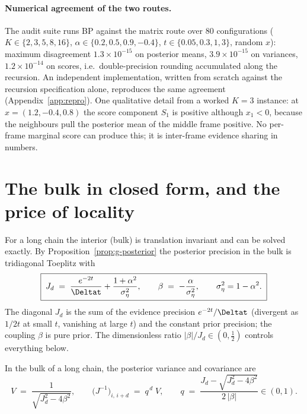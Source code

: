 \paragraph{Numerical agreement of the two routes.} The audit suite runs BP
against the matrix route over $80$ configurations
($K \in \{2,3,5,8,16\}$, $\alpha \in \{0.2, 0.5, 0.9, -0.4\}$,
$t \in \{0.05, 0.3, 1, 3\}$, random $x$): maximum disagreement
$1.3 \times 10^{-15}$ on posterior means, $3.9 \times 10^{-15}$ on
variances, $1.2 \times 10^{-14}$ on scores, i.e.\ double-precision
rounding accumulated along the recursion. An independent implementation,
written from scratch against the recursion specification alone,
reproduces the same agreement (Appendix~\ref{app:repro}). One qualitative
detail from a worked $K = 3$ instance: at $x = (1.2, -0.4, 0.8)$ the score
component $S_1$ is positive although $x_1 < 0$, because the neighbours
pull the posterior mean of the middle frame positive. No per-frame
marginal score can produce this; it is inter-frame evidence sharing in
numbers.

\section{The bulk in closed form, and the price of locality}
\label{sec:g-bulk}\label{sec:g-locality}\label{sec:bp-truncation}

For a long chain the interior (bulk) is translation invariant and can be
solved exactly. By Proposition~\ref{prop:g-posterior} the posterior
precision in the bulk is tridiagonal Toeplitz with
\begin{equation}
  \boxed{\;
  J_d \;=\; \frac{e^{-2t}}{\Deltat} + \frac{1+\alpha^2}{\sigma_\eta^2},
  \qquad
  \beta \;=\; -\frac{\alpha}{\sigma_\eta^2},
  \qquad \sigma_\eta^2 = 1 - \alpha^2 .
  \;}
  \label{eq:g-bulk-params}
\end{equation}
The diagonal $J_d$ is the sum of the evidence precision $e^{-2t}/\Deltat$
(divergent as $1/2t$ at small $t$, vanishing at large $t$) and the
constant prior precision; the coupling $\beta$ is pure prior. The
dimensionless ratio $|\beta|/J_d \in (0, \tfrac{1}{2})$ controls
everything below.

\begin{theorem}
\label{thm:g-bulk-cov}
In the bulk of a long chain, the posterior variance and covariance are
\begin{equation}
  \boxed{\;
  V \;=\; \frac{1}{\sqrt{J_d^2 - 4\beta^2}},
  \qquad
  \big( J^{-1} \big)_{i,\, i+d} \;=\; q^{\,d}\; V,
  \qquad
  q \;=\; \frac{J_d - \sqrt{J_d^2 - 4\beta^2}}{2\,|\beta|} \in (0, 1).
  \;}
  \label{eq:g-bulk-cov}
\end{equation}
\end{theorem}

